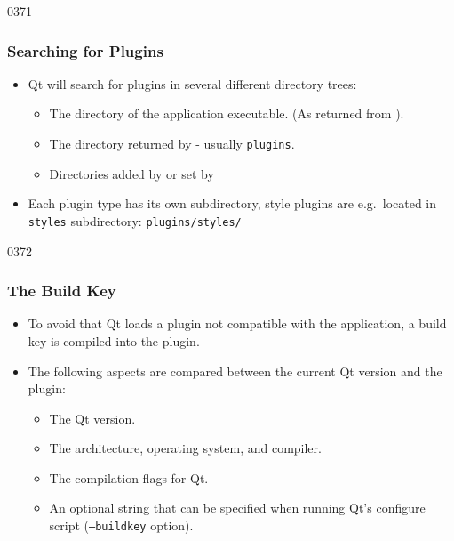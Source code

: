 \begin{slide}{0371}\frametitle{Searching for Plugins}
\begin{itemize}
\item Qt will search for plugins in several different directory trees:
  \begin{itemize}
  \item The directory of the application executable. (As returned from ).
  \item The directory returned by
     - usually
    \texttt{plugins}.
  \item Directories added by  or
    set by 
  \end{itemize}

\item Each plugin type has its own subdirectory, style plugins are e.g.\ located in
  \texttt{styles} subdirectory: \texttt{plugins/styles/}
\end{itemize}
\end{slide}

\begin{slide}{0372}
\frametitle{The Build Key}
\begin{itemize}
\item To avoid that Qt loads a plugin not compatible with the
  application, a build key is compiled into the plugin.
\item The following aspects are compared between the
  current Qt version and the plugin:
  \begin{itemize}
  \item The Qt version.
  \item The architecture, operating system, and compiler.
  \item The compilation flags for Qt. 
  \item An optional string that can be specified when running Qt's
    configure script (\texttt{--buildkey} option).
  \end{itemize}
\end{itemize}
\end{slide}

